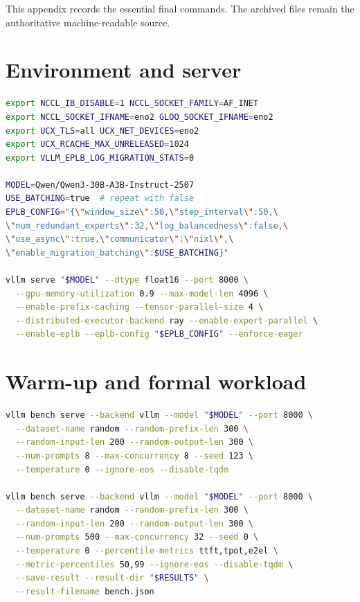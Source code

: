 \label{app:commands}

This appendix records the essential final commands. The archived
 files remain the authoritative machine-readable source.

\section{Environment and server}

\begin{lstlisting}[style=code,language=bash]
export NCCL_IB_DISABLE=1 NCCL_SOCKET_FAMILY=AF_INET
export NCCL_SOCKET_IFNAME=eno2 GLOO_SOCKET_IFNAME=eno2
export UCX_TLS=all UCX_NET_DEVICES=eno2
export UCX_RCACHE_MAX_UNRELEASED=1024
export VLLM_EPLB_LOG_MIGRATION_STATS=0

MODEL=Qwen/Qwen3-30B-A3B-Instruct-2507
USE_BATCHING=true  # repeat with false
EPLB_CONFIG="{\"window_size\":50,\"step_interval\":50,\
\"num_redundant_experts\":32,\"log_balancedness\":false,\
\"use_async\":true,\"communicator\":\"nixl\",\
\"enable_migration_batching\":$USE_BATCHING}"

vllm serve "$MODEL" --dtype float16 --port 8000 \
  --gpu-memory-utilization 0.9 --max-model-len 4096 \
  --enable-prefix-caching --tensor-parallel-size 4 \
  --distributed-executor-backend ray --enable-expert-parallel \
  --enable-eplb --eplb-config "$EPLB_CONFIG" --enforce-eager
\end{lstlisting}

\section{Warm-up and formal workload}

\begin{lstlisting}[style=code,language=bash]
vllm bench serve --backend vllm --model "$MODEL" --port 8000 \
  --dataset-name random --random-prefix-len 300 \
  --random-input-len 200 --random-output-len 300 \
  --num-prompts 8 --max-concurrency 8 --seed 123 \
  --temperature 0 --ignore-eos --disable-tqdm

vllm bench serve --backend vllm --model "$MODEL" --port 8000 \
  --dataset-name random --random-prefix-len 300 \
  --random-input-len 200 --random-output-len 300 \
  --num-prompts 500 --max-concurrency 32 --seed 0 \
  --temperature 0 --percentile-metrics ttft,tpot,e2el \
  --metric-percentiles 50,99 --ignore-eos --disable-tqdm \
  --save-result --result-dir "$RESULTS" \
  --result-filename bench.json
\end{lstlisting}

